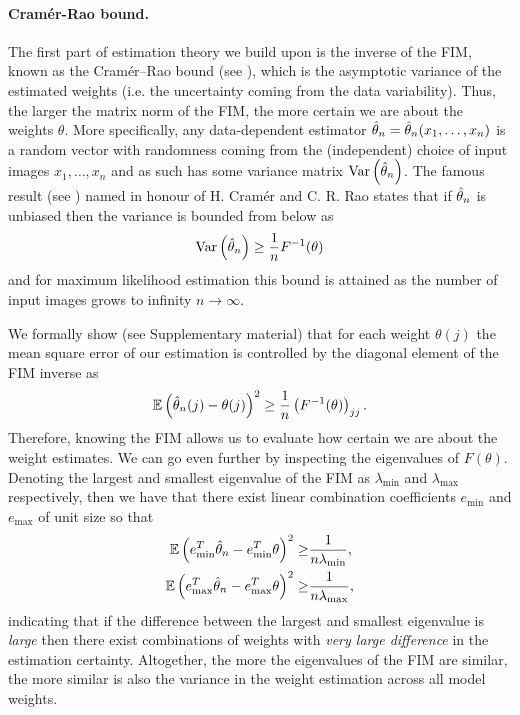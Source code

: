 \paragraph{Cramér-Rao bound.} The first part of estimation theory we build upon is the inverse of the FIM, known as the Cramér–Rao bound (see \cite{frieden2010exploratory}), which is the asymptotic variance of the estimated weights (i.e. the uncertainty coming from the data variability). Thus, the larger the matrix norm of the FIM, the more certain we are about the weights $\theta$. More specifically, any data-dependent estimator $\Hat{\theta}_n=\Hat{\theta}_n(x_1,\dots,x_n)$ is a random vector with randomness coming from the (independent) choice of input images $x_1,\dots,x_n$ and as such has some variance matrix $\text{Var}\left(\Hat{\theta}_n\right)$. The famous result (see \cite{cramer1999mathematical, rao1992information}) named in honour of H. Cramér and C. R. Rao states that if $\Hat{\theta}_n$ is unbiased then the variance is bounded from below as
\begin{align}
    \text{Var}\left(\Hat{\theta}_n\right)\geq \frac{1}{n}F^{-1}(\theta)
\end{align}
and for maximum likelihood estimation this bound is attained as the number of input images grows to infinity $n\to\infty$. 

We formally show  (see Supplementary material) that  for each weight $\theta(j)$ the mean square error of our estimation is controlled by the diagonal element of the FIM inverse as
\begin{align}
    \mathbb{E}\left( \Hat{\theta}_n(j)-\theta(j)\right)^2\geq \frac{1}{n}\left(F^{-1}(\theta)\right)_{jj}.
\end{align}
Therefore, knowing the FIM allows us to evaluate how certain we are about the weight estimates. We can go even further by inspecting the eigenvalues of $F(\theta)$. Denoting the largest and smallest eigenvalue of the FIM as $\lambda_{\min}$ and $\lambda_{\max}$ respectively, then we have that there exist linear combination coefficients $e_{\min}$ and $e_{\max}$ of unit size so that
\begin{align}
    \mathbb{E}\left( e_{\min}^T\Hat{\theta}_n-e_{\min}^T\theta\right)^2\geq &\frac{1}{n\lambda_{\min}},\nonumber\\ 
    \mathbb{E}\left( e_{\max}^T\Hat{\theta}_n-e_{\max}^T\theta\right)^2\geq &\frac{1}{n\lambda_{\max}},
\end{align}
indicating that if the difference between the largest and smallest eigenvalue is \textit{large} then there exist combinations of weights with \textit{very large difference} in the estimation certainty. Altogether, the more the eigenvalues of the FIM are similar, the more similar is also the variance in the weight estimation across all model weights.

